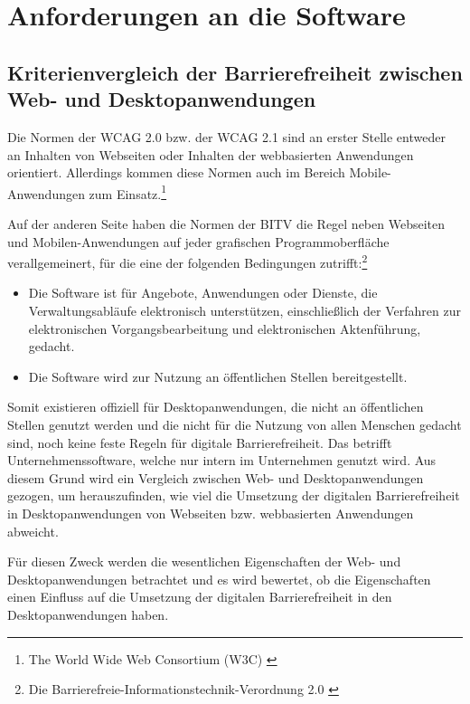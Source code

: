 \section{Anforderungen an die Software}

\subsection{Kriterienvergleich der Barrierefreiheit zwischen Web- und Desktopanwendungen}
\label{subsec: Kriterienvergleich der Barrierefreiheit zwischen Web- und Desktopanwendungen}

Die Normen der \ac{WCAG} 2.0 bzw. der \ac{WCAG} 2.1 sind an erster Stelle entweder an Inhalten von Webseiten oder Inhalten der webbasierten Anwendungen orientiert. Allerdings kommen diese Normen auch im Bereich Mobile-Anwendungen zum Einsatz.\footnote{The World Wide Web Consortium (W3C) \cite{w3c}}

Auf der anderen Seite haben die Normen der \ac{BITV} die Regel neben Webseiten und Mobilen-Anwendungen auf jeder grafischen Programmoberfläche verallgemeinert, für die eine der folgenden Bedingungen zutrifft:\footnote{Die Barrierefreie-Informationstechnik-Verordnung 2.0 \cite{BITV}}

\begin{itemize}
	\item Die Software ist für Angebote, Anwendungen oder Dienste, die Verwaltungsabläufe elektronisch unterstützen, einschließlich der Verfahren zur elektronischen Vorgangsbearbeitung 
	und elektronischen Aktenführung, gedacht.
	\item Die Software wird zur Nutzung an öffentlichen Stellen bereitgestellt.
\end{itemize}

Somit existieren offiziell für Desktopanwendungen, die nicht an öffentlichen Stellen genutzt werden und die nicht für die Nutzung von allen Menschen gedacht sind, noch keine feste Regeln für digitale Barrierefreiheit. Das betrifft Unternehmenssoftware, welche nur intern im Unternehmen genutzt wird. Aus diesem Grund wird ein Vergleich zwischen Web- und Desktopanwendungen gezogen, um herauszufinden, wie viel die Umsetzung der digitalen Barrierefreiheit in Desktopanwendungen von Webseiten bzw. webbasierten Anwendungen abweicht.

Für diesen Zweck werden die wesentlichen Eigenschaften der Web- und Desktopanwendungen betrachtet und es wird bewertet, ob die Eigenschaften einen Einfluss auf die Umsetzung der digitalen Barrierefreiheit in den Desktopanwendungen haben.

